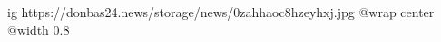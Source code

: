  
 
 
 
 

\ifcmt
  ig https://donbas24.news/storage/news/0zahhaoc8hzeyhxj.jpg
  @wrap center
  @width 0.8
\fi
